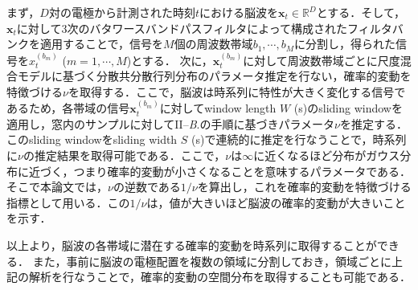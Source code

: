 \documentclass[journal]{IEEEtran}
\begin{document}
まず，$D$対の電極から計測された時刻$t$における脳波を$\mathbf{x}_t \in \mathbb{R}^D$とする．そして，$\mathbf{x}_t$に対して3次のバタワースバンドパスフィルタによって構成されたフィルタバンクを適用することで，信号を$M$個の周波数帯域$b_1, \cdots, b_M$に分割し，得られた信号を$x_t^{(b_m)}$ ($m = 1,\cdots, M$)とする．
次に，$\mathbf{x}^{(b_m)}_t$に対して周波数帯域ごとに尺度混合モデルに基づく分散共分散行列分布のパラメータ推定を行ない，確率的変動を特徴づける$\nu$を取得する．ここで，脳波は時系列に特性が大きく変化する信号であるため，各帯域の信号$\mathbf{x}^{(b_m)}_t$に対してwindow length $W$ (s)のsliding windowを適用し，窓内のサンプルに対してII--\textit{B}.の手順に基づきパラメータ$\nu$を推定する．このsliding windowをsliding width $S$ (s)で連続的に推定を行なうことで，時系列に$\nu$の推定結果を取得可能である．ここで，$\nu$は$\infty$に近くなるほど分布がガウス分布に近づく，つまり確率的変動が小さくなることを意味するパラメータである．そこで本論文では，$\nu$の逆数である$1/\nu$を算出し，これを確率的変動を特徴づける指標として用いる．この$1/\nu$は，値が大きいほど脳波の確率的変動が大きいことを示す．

以上より，脳波の各帯域に潜在する確率的変動を時系列に取得することができる．
また，事前に脳波の電極配置を複数の領域に分割しておき，領域ごとに上記の解析を行なうことで，確率的変動の空間分布を取得することも可能である．

%
%
\end{document}
